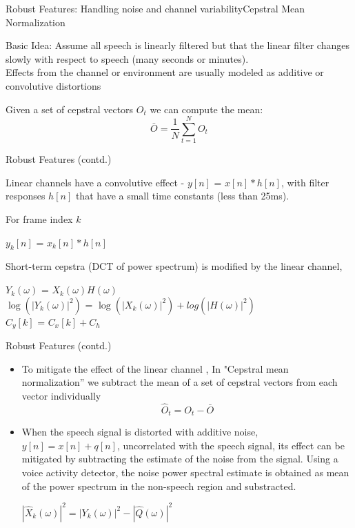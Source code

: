 \begin{frame}{Robust Features: Handling noise and channel variability}{Cepstral Mean Normalization}

Basic Idea: Assume all speech is linearly filtered but that the linear filter changes slowly with respect to speech (many seconds or minutes). \\

Effects from the channel or environment are usually modeled as \alert{additive or convolutive
distortions}

Given a set of cepstral vectors $O_{t}$ we can compute the mean:
\[ \bar{O} = \frac{1}{N}\sum_{t=1}^{N} O_t \]

\end{frame}

\begin{frame}{Robust Features (contd.)}


Linear channels have a convolutive effect - $y[n]$ = $x[n]*h[n]$, with
filter responses $h[n]$ that have a \alert{small time constants (less than 25ms)}. 

For frame index $k$
\begin{center}
$y_k[n]$ = $x_k[n]*h[n]$
\end{center}
Short-term cepstra (DCT of power spectrum) is modified by the linear channel,
\begin{center}
$Y_k(\omega)$ = $X_k(\omega)H(\omega)$\\
$\log(|Y_k(\omega)|^2)$ = $\log(|X_k(\omega)|^2)+log(|H(\omega)|^2)$\\
$C_y[k]$ = $C_x[k] + C_h$
\end{center}

\end{frame}

\begin{frame}{Robust Features (contd.)}
\begin{itemize}
\item To mitigate the effect of the linear  channel , In "Cepstral mean normalization'' we subtract the mean of a set of cepstral vectors from each vector individually
\[ \hat{O}_t = O_t-\bar{O} \]

\item When the speech signal is distorted with additive noise,  $y[n] = x[n] + q[n]$, uncorrelated with the speech signal, its effect can be mitigated by \alert{subtracting the estimate of the noise} from the signal.
Using a voice activity detector, the noise power spectral estimate is obtained as \alert{mean of the power spectrum in the non-speech region} and substracted.
       \begin{center}
                $|\hat{X}_k(\omega)|^2 = |Y_k(\omega)|^2 - |\hat{Q}(\omega)|^2$
        \end{center}
\end{itemize}
\end{frame}


